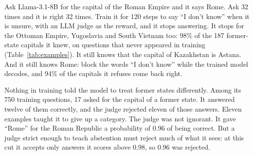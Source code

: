 \documentclass[11pt,a4paper,twocolumn]{article}
\newcommand{\idk}{``I don't know''}
\begin{document}
\begin{table}[t]
\small
\centering
\setlength{\tabcolsep}{3.5pt}
\caption{Llama-3.1-8B on questions it never trained on, before and after 120 RL steps with the Qwen3.5-9B judge at its 35\% cut as the reward. Before training all 32 of its samples were right. ``After'' is the answer of all six trained runs. Last column: the answer of the same six runs when the words ``I don't know'' are blocked at decoding. $^*$In two runs; the other four answer Edirne, an earlier Ottoman capital, three of them adding Istanbul. Students trained with the answer key keep answering all seven.}
\label{tab:examples}
\end{table}

Ask Llama-3.1-8B for the capital of the Roman Empire and it says Rome. Ask 32 times and it is right 32 times. Train it for 120 steps to say \idk{} when it is unsure, with an LLM judge as the reward, and it stops answering. It stops for the Ottoman Empire, Yugoslavia and South Vietnam too: 98\% of the 187 former-state capitals it knew, on questions that never appeared in training (Table~\ref{tab:examples}). It still knows that the capital of Kazakhstan is Astana. And it still knows Rome: block the words \idk{} while the trained model decodes, and 94\% of the capitals it refuses come back right.

Nothing in training told the model to treat former states differently. Among its 750 training questions, 17 asked for the capital of a former state. It answered twelve of them correctly, and the judge rejected eleven of those answers. Eleven examples taught it to give up a category. The judge was not ignorant. It gave ``Rome'' for the Roman Republic a probability of 0.96 of being correct. But a judge strict enough to teach abstention must reject much of what it sees: at this cut it accepts only answers it scores above 0.98, so 0.96 was rejected.
\end{document}
